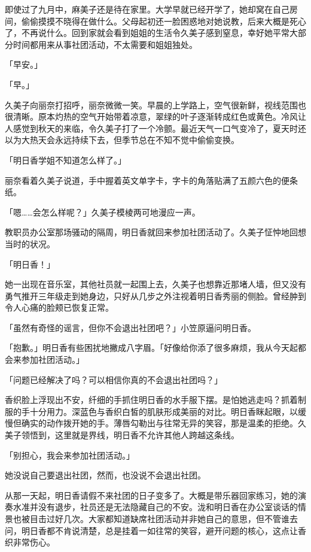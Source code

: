 \documentclass[UTF8]{ctexart}
\begin{document}
    即使过了九月中，麻美子还是待在家里。大学早就已经开学了，她却窝在自己房间，偷偷摸摸不晓得在做什么。父母起初还一脸困惑地对她说教，后来大概是死心了，不再说什么。回到家就会看到姐姐的生活令久美子感到窒息，幸好她平常大部分时间都用来从事社团活动，不太需要和姐姐独处。 

    「早安。」 

    「早。」 

    久美子向丽奈打招呼，丽奈微微一笑。早晨的上学路上，空气很新鲜，视线范围也很清晰。原本灼热的空气开始带着凉意，翠绿的叶子逐渐转成红色或黄色。冷风让人感觉到秋天的来临，令久美子打了一个冷颤。最近天气一口气变冷了，夏天时还以为大热天会永远持续下去，但季节总在不知不觉中偷偷变换。 

    「明日香学姐不知道怎么样了。」 

    丽奈看着久美子说道，手中握着英文单字卡，字卡的角落贴满了五颜六色的便条纸。 

    「嗯……会怎么样呢？」久美子模棱两可地漫应一声。 

    教职员办公室那场骚动的隔周，明日香就回来参加社团活动了。久美子怔忡地回想当时的状况。 

    「明日香！」 

    她一出现在音乐室，其他社员就一起围上去，久美子也想靠近那堵人墙，但又没有勇气推开三年级走到她身边，只好从几步之外注视着明日香秀丽的侧脸。曾经肿到令人心痛的脸颊已恢复正常。 

    「虽然有奇怪的谣言，但你不会退出社团吧？」小笠原逼问明日香。 

    「抱歉。」明日香有些困扰地撇成八字眉。「好像给你添了很多麻烦，我从今天起都会来参加社团活动。」 

    「问题已经解决了吗？可以相信你真的不会退出社团吗？」 

    香织脸上浮现出不安，纤细的手抓住明日香的水手服下摆。是怕她逃走吗？抓着制服的手十分用力。深蓝色与香织白皙的肌肤形成美丽的对比。明日香眯起眼，以缓慢但确实的动作拨开她的手。薄唇勾勒出与往常无异的笑容，那是温柔的拒绝。久美子领悟到，这里就是界线，明日香不允许其他人跨越这条线。 

    「别担心，我会来参加社团活动。」 

    她没说自己要退出社团，然而，也没说不会退出社团。 

    从那一天起，明日香请假不来社团的日子变多了。大概是带乐器回家练习，她的演奏水准并没有退步，社员还是无法隐藏自己的不安。泷和明日香在办公室谈话的情景也被目击过好几次。大家都知道缺席社团活动并非她自己的意思，但不管谁去问，明日香都不肯说清楚，总是挂着一如往常的笑容，避开问题的核心，这点让香织非常伤心。 
\end{document}

